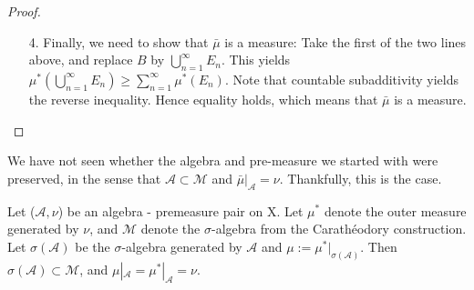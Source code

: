 \documentclass[11pt]{scrartcl}
\begin{document}
\begin{proof}
\begin{itemize}
Next, note that we once again have by (*) that for any N,
\begin{align*}
\mu^*(B) = & \mu^*(B\cap (\bigcup_{n=1}^N E_n)) + \mu^*(B\cap (\bigcup_{n=1}^N E_n)^c) \\
 \geq  & \sum_{n=1}^N \mu^*(B \cap E_n) + \mu^*(B\cap (\bigcup_{n=1}^\infty E_n)^c)
\end{align*}
where the inequality derives from the observation that $(\bigcup_{n=1}^N E_n)^c)$ is a decreasing chain. Note that the left-hand side of the equation is independent of $N$, so it also holds for the limit.
Thus 
\begin{align*}
\mu^*(B) \geq & \sum_{n=1}^\infty \mu^*(B \cap E_n) + \mu^*(B\cap (\bigcup_{n=1}^\infty E_n)^c)\\
 \geq  & \mu^*(B\cap (\bigcup_{n=1}^\infty E_n)) + \mu^*(B\cap (\bigcup_{n=1}^\infty E_n)^c)
\end{align*}
This completes the proof. $\mathcal{M}$ is a closed under countable union, and is therefore a $\sigma$-algebra.
\item[4.]Finally, we need to show that $\bar{\mu}$ is a measure:
Take the first of the two lines above, and replace $B$ by $\bigcup_{n=1}^\infty E_n$. This yields $\mu^*(\bigcup_{n=1}^\infty E_n) \geq  \sum_{n=1}^\infty \mu^*(E_n)$. Note that countable subadditivity yields the reverse inequality. Hence equality holds, which means that $\bar{\mu}$ is a measure.
\end{itemize}
\end{proof}

\begin{remark}
We have not seen whether the algebra and pre-measure we started with were preserved, in the sense that $\mathcal{A}\subset \mathcal{M}$ and $\bar{\mu}|_\mathcal{A} = \nu$. Thankfully, this is the case. 
\end{remark}

\begin{theorem} Let ($\mathcal{A},\nu$) be an algebra - premeasure pair on X. Let $\mu^*$ denote the outer measure generated by $\nu$, and $\mathcal{M}$ denote the $\sigma$-algebra from the Carath\'eodory construction. Let $\sigma(\mathcal{A})$ be the $\sigma$-algebra generated by $\mathcal{A}$ and $\mu := \mu^*|_{\sigma(\mathcal{A})}$. Then $\sigma(\mathcal{A}) \subset \mathcal{M}$, and $\mu|_\mathcal{A} = \mu^*|_\mathcal{A} = \nu$.
\end{theorem}
\end{document}

